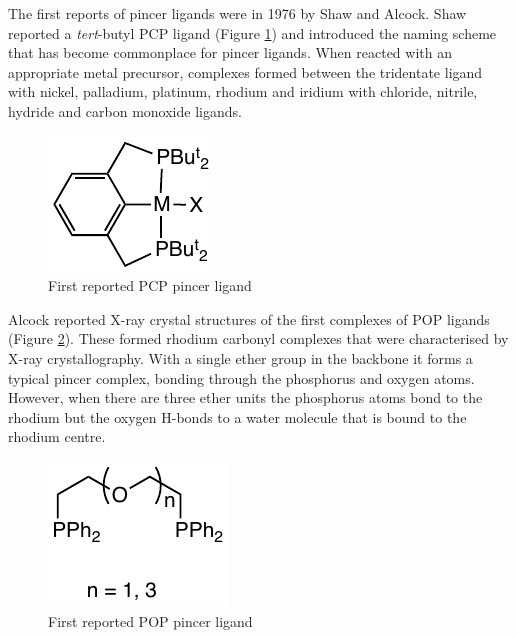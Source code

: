 The first reports of pincer ligands were in 1976 by Shaw\cite{Moulton1976} and Alcock.\cite{Alcock1976}  Shaw reported a \emph{tert}-butyl PCP ligand (Figure \ref{Shaw}) and introduced the naming scheme that has become commonplace for pincer ligands.  When reacted with an appropriate metal precursor, complexes formed between the tridentate ligand with nickel, palladium, platinum, rhodium and iridium with chloride, nitrile, hydride and carbon monoxide ligands.\cite{Moulton1976} 

\begin{figure}[ht]
\centering
\includegraphics[]{../Figures/Shaw.pdf}
\caption[First reported PCP pincer ligand]{First reported PCP pincer ligand}
\label{Shaw}
\end{figure}

Alcock reported X-ray crystal structures of the first complexes of POP ligands (Figure \ref{Alcock}).\cite{Alcock1976}  These formed rhodium carbonyl complexes that were characterised by X-ray crystallography.  With a single ether group in the backbone it forms a typical pincer complex, bonding through the phosphorus and oxygen atoms.  However, when there are three ether units the phosphorus atoms bond to the rhodium but the oxygen H-bonds to a water molecule that is bound to the rhodium centre.\cite{Alcock1976}

\begin{figure}[ht]
\centering
\includegraphics[]{../Figures/Alcock.pdf}
\caption[First reported POP pincer ligand]{First reported POP pincer ligand}
\label{Alcock}
\end{figure}



